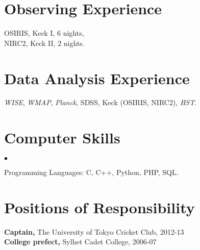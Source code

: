 \documentclass[margin,line]{res}
\newenvironment{list2}{
  \begin{list}{$\bullet$}{%
      \setlength{\itemsep}{0in}
      \setlength{\parsep}{0in} \setlength{\parskip}{0in}
      \setlength{\topsep}{0in} \setlength{\partopsep}{0in} 
      \setlength{\leftmargin}{0.2in}}}{\end{list}}
\begin{document}
\begin{resume}
\section{\sc Observing Experience}
OSIRIS, Keck I, 6 nights,\\
NIRC2, Keck II, 2 nights.

\section{\sc Data Analysis Experience}
{\it WISE}, {\it WMAP}, {\it Planck}, SDSS, Keck (OSIRIS, NIRC2), {\it HST}.

%
%
%

\section{\sc Computer Skills} 
\begin{list2}
	\item Programming Languages:  C, C++, Python, PHP, SQL.\\ 
\end{list2}

\section{\sc Positions of Responsibility}
{\bf Captain,} The University of Tokyo Cricket Club, 2012-13 \\
{\bf College prefect,} Sylhet Cadet College, 2006-07

\end{resume}
\end{document}

